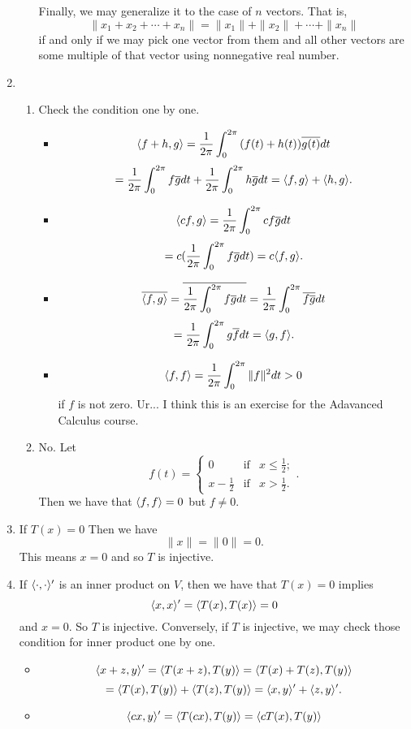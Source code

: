 \begin{enumerate}
\begin{enumerate}
Finally, we may generalize it to the case of $n$ vectors. That is, 
\[\|x_1+x_2+\cdots +x_n\|=\|x_1\|+\|x_2\|+\cdots +\|x_n\|\]
if and only if we may pick one vector from them and all other vectors are some multiple of that vector using nonnegative real number.
\end{enumerate}
\item \begin{enumerate}
\item Check the condition one by one.\begin{itemize}
\item \[\langle f+h,g\rangle=\frac{1}{2\pi}\int_0^{2\pi}{(f(t)+h(t))\overline{g(t)}dt}\]
\[=\frac{1}{2\pi}\int_0^{2\pi}{f\overline{g}dt}+\frac{1}{2\pi}\int_0^{2\pi}{h\overline{g}dt}=\langle f,g\rangle +\langle h,g\rangle.\]
\item \[\langle cf,g\rangle=\frac{1}{2\pi}\int_0^{2\pi}{cf\overline{g}dt}\]
\[=c(\frac{1}{2\pi}\int_0^{2\pi}{f\overline{g}dt})=c\langle f,g\rangle .\]
\item \[\overline{\langle f,g\rangle}=\overline{\frac{1}{2\pi}\int_0^{2\pi}{f\overline{g}dt}}=\frac{1}{2\pi}\int_0^{2\pi}{\overline{f\overline{g}}dt}\]
\[=\frac{1}{2\pi}\int_0^{2\pi}{g\overline{f}dt}=\langle g,f\rangle.\]
\item \[\langle f,f\rangle =\frac{1}{2\pi}\int_0^{2\pi}{\|f\|^2dt}>0\]
if $f$ is not zero. Ur... I think this is an exercise for the Adavanced Calculus course.
\end{itemize}
\item No. Let 
\[f(t)=\left\{\begin{array}{ccc}0&\mathrm{if} &x\leq \frac{1}{2};\\x-\frac{1}{2}&\mathrm{if} &x>\frac{1}{2}.\end{array}\right..\]
Then we have that $\langle f,f\rangle=0$ but $f\neq 0$.
\end{enumerate}
\item If $T(x)=0$ Then we have 
\[\|x\|=\|0\|=0.\]
This means $x=0$ and so $T$ is injective.
\item If $\langle \cdot, \cdot \rangle'$ is an inner product on $V$, then we have that $T(x)=0$ implies 
\[\langle x,x\rangle'=\langle T(x),T(x)\rangle =0\]
and $x=0$. So $T$ is injective. Conversely, if $T$ is injective, we may check those condition for inner product one by one.
\begin{itemize}
\item \[\langle x+z,y\rangle'=\langle T(x+z),T(y)\rangle =\langle T(x)+T(z),T(y)\rangle\]
\[=\langle T(x),T(y)\rangle +\langle T(z),T(y)\rangle =\langle x,y\rangle' +\langle z,y\rangle' .\]
\item \[\langle cx,y\rangle'=\langle T(cx),T(y)\rangle =\langle cT(x),T(y)\rangle\]

\end{itemize}
\end{enumerate}
